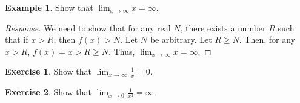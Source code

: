 \documentclass[english]{book}
\theoremstyle{remark}
\theoremstyle{definition}
\newtheorem{excs}{Exercise}
\newtheorem{exle}[theorem]{Example}
\newtheorem*{next week}{Next Week}
\newcommand{\dlim}{\displaystyle\lim}
\begin{document}
\begin{exle}
	Show that $\dlim_{x\to \infty} x=\infty$.
\end{exle}
\begin{proof}[Response]
	We need to show that for any real $N$, there exists a number $R$ such that if $x>R$, then $f(x)>N$. Let $N$ be arbitrary. Let $R\geq N$. Then, for any $x>R$, $f(x)=x>R\geq N$. Thus, $\lim_{x\to \infty}x=\infty$. 
\end{proof}
\begin{excs}
	Show that $\dlim_{x\to \infty} \frac{1}{x}=0$. 
\end{excs}
\begin{excs}Show that $\dlim_{x\to 0}\frac{1}{x^2}=\infty$. 
\end{excs}
\end{document}
